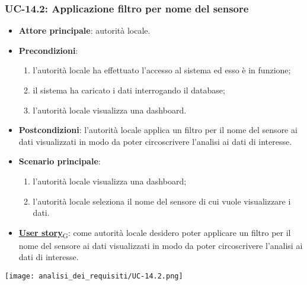 \subsubsection{UC-14.2: Applicazione filtro per nome del sensore}
\begin{itemize}
	\item \textbf{Attore principale}: autorità locale.
	\item \textbf{Precondizioni}:
	      \begin{enumerate}
		      \item l'autorità locale ha effettuato l'accesso al sistema ed esso è in funzione;
		      \item il sistema ha caricato i dati interrogando il database;
		      \item l'autorità locale visualizza una dashboard.
	      \end{enumerate}
	\item \textbf{Postcondizioni}: l'autorità locale applica un filtro per il nome del sensore ai dati visualizzati in modo da poter circoscrivere l'analisi ai dati di interesse.
	\item \textbf{Scenario principale}:
	      \begin{enumerate}
		      \item l'autorità locale visualizza una dashboard;
		      \item l'autorità locale seleziona il nome del sensore di cui vuole visualizzare i dati.
	      \end{enumerate}
	\item \href{https://7last.github.io/docs/rtb/documentazione-interna/glossario\#user-story}{\textbf{User story}\textsubscript{G}}:
	      come autorità locale desidero poter applicare un filtro per il nome del sensore ai dati visualizzati in modo da poter circoscrivere l'analisi ai dati di interesse.
\end{itemize}
\begin{center}
	\texttt{[image: analisi\_dei\_requisiti/UC-14.2.png]}
\end{center}

